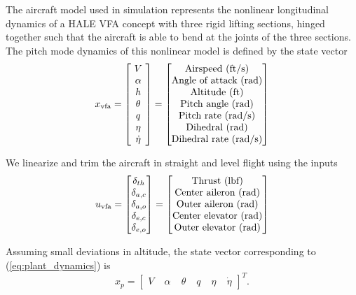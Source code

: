 \documentclass[english]{ifacconf}
\begin{document}
The aircraft model used in simulation represents the nonlinear longitudinal dynamics of a HALE VFA concept with three rigid lifting sections, hinged together such that the aircraft is able to bend at the joints of the three sections. The pitch mode dynamics of this nonlinear model is defined by the state vector
\begin{equation}
x_{\text{vfa}} = \begin{bmatrix}
~V~\\
\alpha \\
h \\
\theta \\
q\\
\eta\\
\dot{\eta}
\end{bmatrix} =
\begin{bmatrix}
	 $Airspeed (ft/s)$\\ $Angle of attack (rad)$\\ $Altitude (ft)$\\ $Pitch angle (rad)$\\ $Pitch rate (rad/s)$\\ $Dihedral (rad)$\\ $Dihedral rate (rad/s)$
\end{bmatrix}
\end{equation}

We linearize and trim the aircraft in straight and level flight using the inputs
\begin{equation}
	u_{\text{vfa}} = \begin{bmatrix}
\delta_{th} \\
\delta_{a,c} \\
\delta_{a,o} \\
\delta_{e,c} \\
\delta_{e,o} 
\end{bmatrix} = \begin{bmatrix}
		$Thrust (lbf)$\\
		$Center aileron (rad)$\\
		$Outer aileron (rad)$\\
		$Center elevator (rad)$\\
		$Outer elevator (rad)$
	\end{bmatrix}
\end{equation}

Assuming small deviations in altitude, the state vector corresponding to (\ref{eq:plant_dynamics}) is
\begin{equation}
	x_p = \begin{bmatrix}
V & \; \alpha & \; \theta & \; q & \; \eta & \; \dot{\eta}
\end{bmatrix}^T.
\end{equation}
\end{document}
